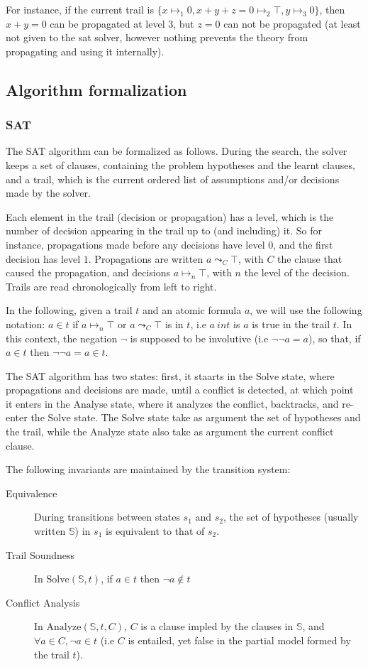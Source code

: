 For instance, if the current trail is $\{x \mapsto_1 0, x + y + z = 0 \mapsto_2 \top, y\mapsto_3 0\}$,
then $x + y = 0$ can be propagated at level $3$, but $z = 0$ can not be propagated (at least not
given to the sat solver, however nothing prevents the theory from propagating and using it internally).

\subsection{Algorithm formalization}

\subsubsection{SAT}

The SAT algorithm can be formalized as follows. During the search, the solver keeps
a set of clauses, containing the problem hypotheses and the learnt clauses, and
a trail, which is the current ordered list of assumptions and/or decisions made by
the solver.

Each element in the trail (decision or propagation) has a level, which is the number of decision
appearing in the trail up to (and including) it. So for instance, propagations made before any
decisions have level $0$, and the first decision has level $1$. Propagations are written
$a \leadsto_C \top$, with $C$ the clause that caused the propagation, and decisions
$a \mapsto_n \top$, with $n$ the level of the decision. Trails are read
chronologically from left to right.

In the following, given a trail $t$ and an atomic formula $a$, we will use the following notation:
$a \in t$ if $a \mapsto_n \top$ or $a \leadsto_C \top$ is in $t$, i.e $a\ in t$ is $a$ is true
in the trail $t$. In this context, the negation $\neg$ is supposed to be involutive (i.e $\neg \neg a = a$),
so that, if $a \in t$ then $\neg \neg a = a \in t$.

The SAT algorithm has two states: first, it staarts in the $\text{Solve}$ state, where propagations
and decisions are made, until a conflict is detected, at which point it enters in the $\text{Analyse}$
state, where it analyzes the conflict, backtracks, and re-enter the $\text{Solve}$ state.
The $\text{Solve}$ state take as argument the set of hypotheses and the trail, while
the $\text{Analyze}$ state also take as argument the current conflict clause.

The following invariants are maintained by the transition system:
\begin{description}
  \item[Equivalence] During transitions between states $s_1$ and $s_2$, the set of hypotheses
    (usually written $\mathbb{S}$) in $s_1$ is equivalent to that of $s_2$.
  \item[Trail Soundness] In $\text{Solve}(\mathbb{S}, t)$, if $a \in t$ then $\neg a \notin t$
  \item[Conflict Analysis] In $\text{Analyze}(\mathbb{S}, t, C)$, $C$ is a clause impled by the
    clauses in $\mathbb{S}$, and $\forall a \in C, \neg a \in t$ (i.e $C$ is entailed, yet false
    in the partial model formed by the trail $t$).
\end{description}

